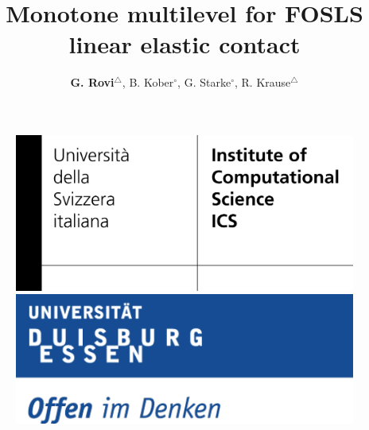 \documentclass[8pt, oneside]{beamer}   	%
\title{ \textcolor{dkgrey}{  \textbf{Monotone multilevel for FOSLS linear elastic contact} }}
\author[]{\textcolor{dkgrey}{\textbf{G. Rovi}$^\bigtriangleup$, B. Kober$^\circ$, G. Starke$^\circ$, R. Krause$^\bigtriangleup$}}
\institute{$\circ$: Universit\"at Duisburg\,-\,Essen, Germany \\ 
$\bigtriangleup$: Universit\aaa~della Svizzera italiana, Switzerland}
\begin{document}
 \begin{frame}
\titlepage
\begin{figure}[htbp!]
	\includegraphics[scale=0.7]{img/logo_ics}
	\quad
		\includegraphics[scale=0.3]{img/essenlogo}
\end{figure}
\end{frame}








 
\end{document}
